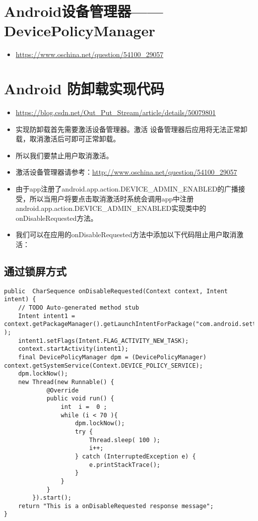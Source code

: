 \documentclass[9pt, b5paper]{article}
\begin{document}
\section{Android设备管理器——DevicePolicyManager}
\label{sec-3}
\begin{itemize}
\item \url{https://www.oschina.net/question/54100_29057}
\end{itemize}



\section{Android 防卸载实现代码}
\label{sec-4}
\begin{itemize}
\item \url{https://blog.csdn.net/Out_Put_Stream/article/details/50079801}
\item 实现防卸载首先需要激活设备管理器。激活 设备管理器后应用将无法正常卸载，取消激活后可即可正常卸载。
\item 所以我们要禁止用户取消激活。
\item 激活设备管理器请参考：\url{http://www.oschina.net/question/54100_29057}
\item 由于app注册了android.app.action.DEVICE\_ADMIN\_ENABLED的广播接受，所以当用户将要点击取消激活时系统会调用app中注册android.app.action.DEVICE\_ADMIN\_ENABLED实现类中的onDisableRequested方法。
\item 我们可以在应用的onDisableRequested方法中添加以下代码阻止用户取消激活：
\end{itemize}
\subsection{通过锁屏方式}
\label{sec-4-1}
\begin{verbatim}
public  CharSequence onDisableRequested(Context context, Intent intent) {
    // TODO Auto-generated method stub   
    Intent intent1 = context.getPackageManager().getLaunchIntentForPackage("com.android.settings" );  
    intent1.setFlags(Intent.FLAG_ACTIVITY_NEW_TASK);  
    context.startActivity(intent1);
    final DevicePolicyManager dpm = (DevicePolicyManager) context.getSystemService(Context.DEVICE_POLICY_SERVICE);  
    dpm.lockNow();  
    new Thread(new Runnable() {            
            @Override   
            public void run() {  
                int  i =  0 ;  
                while (i < 70 ){  
                    dpm.lockNow();  
                    try {  
                        Thread.sleep( 100 );  
                        i++;  
                    } catch (InterruptedException e) {  
                        e.printStackTrace();  
                    }  
                }  
            }  
        }).start();  
    return "This is a onDisableRequested response message";  
}
\end{verbatim}
\end{document}
